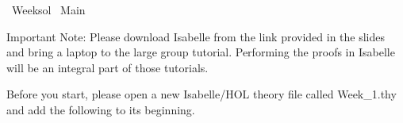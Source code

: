 %
\begin{isabellebody}%
%
%
\isadelimtheory
\isanewline
%
\endisadelimtheory
%
\isatagtheory
{}\isamarkupfalse%
\ Week{\isacharunderscore}{\kern0pt}{}{\isacharunderscore}{\kern0pt}sol\isanewline
{}\ Main\isanewline
{}%
\endisatagtheory
{\isafoldtheory}%
%
\isadelimtheory
%
\endisadelimtheory
%
\begin{isamarkuptext}%
\vspace{15ex}%
\end{isamarkuptext}\isamarkuptrue%
%
\begin{isamarkuptext}%
Important Note: Please download Isabelle from the link provided in the slides and bring a 
      laptop to the large group tutorial. Performing the proofs in Isabelle will be an integral part
      of those tutorials.%
\end{isamarkuptext}\isamarkuptrue%
%
\begin{isamarkuptext}%
Before you start, please open a new Isabelle/HOL theory file called Week\_1.thy and add the
       following to its beginning.


\end{isamarkuptext}
\end{isabellebody}
